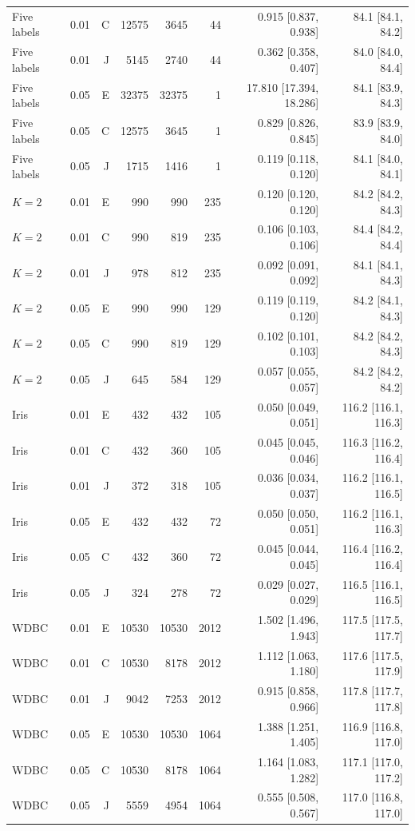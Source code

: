 \begin{table}
\begin{tabular}{lrrrrrrr}
Five labels & 0.01 & C & 12575 & 3645 & 44 & 0.915 [0.837, 0.938] & 84.1 [84.1, 84.2] \\
Five labels & 0.01 & J & 5145 & 2740 & 44 & 0.362 [0.358, 0.407] & 84.0 [84.0, 84.4] \\
Five labels & 0.05 & E & 32375 & 32375 & 1 & 17.810 [17.394, 18.286] & 84.1 [83.9, 84.3] \\
Five labels & 0.05 & C & 12575 & 3645 & 1 & 0.829 [0.826, 0.845] & 83.9 [83.9, 84.0] \\
Five labels & 0.05 & J & 1715 & 1416 & 1 & 0.119 [0.118, 0.120] & 84.1 [84.0, 84.1] \\
$K=2$ & 0.01 & E & 990 & 990 & 235 & 0.120 [0.120, 0.120] & 84.2 [84.2, 84.3] \\
$K=2$ & 0.01 & C & 990 & 819 & 235 & 0.106 [0.103, 0.106] & 84.4 [84.2, 84.4] \\
$K=2$ & 0.01 & J & 978 & 812 & 235 & 0.092 [0.091, 0.092] & 84.1 [84.1, 84.3] \\
$K=2$ & 0.05 & E & 990 & 990 & 129 & 0.119 [0.119, 0.120] & 84.2 [84.1, 84.3] \\
$K=2$ & 0.05 & C & 990 & 819 & 129 & 0.102 [0.101, 0.103] & 84.2 [84.2, 84.3] \\
$K=2$ & 0.05 & J & 645 & 584 & 129 & 0.057 [0.055, 0.057] & 84.2 [84.2, 84.2] \\
Iris & 0.01 & E & 432 & 432 & 105 & 0.050 [0.049, 0.051] & 116.2 [116.1, 116.3] \\
Iris & 0.01 & C & 432 & 360 & 105 & 0.045 [0.045, 0.046] & 116.3 [116.2, 116.4] \\
Iris & 0.01 & J & 372 & 318 & 105 & 0.036 [0.034, 0.037] & 116.2 [116.1, 116.5] \\
Iris & 0.05 & E & 432 & 432 & 72 & 0.050 [0.050, 0.051] & 116.2 [116.1, 116.3] \\
Iris & 0.05 & C & 432 & 360 & 72 & 0.045 [0.044, 0.045] & 116.4 [116.2, 116.4] \\
Iris & 0.05 & J & 324 & 278 & 72 & 0.029 [0.027, 0.029] & 116.5 [116.1, 116.5] \\
WDBC & 0.01 & E & 10530 & 10530 & 2012 & 1.502 [1.496, 1.943] & 117.5 [117.5, 117.7] \\
WDBC & 0.01 & C & 10530 & 8178 & 2012 & 1.112 [1.063, 1.180] & 117.6 [117.5, 117.9] \\
WDBC & 0.01 & J & 9042 & 7253 & 2012 & 0.915 [0.858, 0.966] & 117.8 [117.7, 117.8] \\
WDBC & 0.05 & E & 10530 & 10530 & 1064 & 1.388 [1.251, 1.405] & 116.9 [116.8, 117.0] \\
WDBC & 0.05 & C & 10530 & 8178 & 1064 & 1.164 [1.083, 1.282] & 117.1 [117.0, 117.2] \\
WDBC & 0.05 & J & 5559 & 4954 & 1064 & 0.555 [0.508, 0.567] & 117.0 [116.8, 117.0] \\
\bottomrule
\end{tabular}
\end{table}

